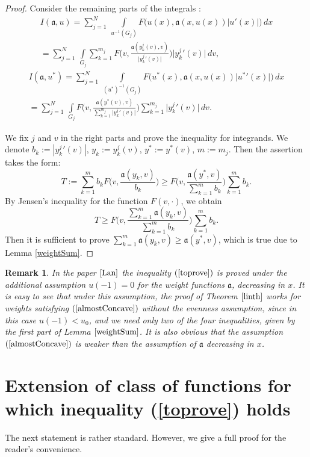 \documentclass[12pt]{article}
\newcommand{\abs}[1]{\left\vert#1\right\vert}
\newcommand{\bigabs}[1]{\bigl\vert#1\bigr\vert}
\renewcommand{\ge}{\geqslant}
\newtheorem{rem}{Remark}
\begin{document}
\begin{proof}
Consider the remaining parts of the integrals :
\begin{multline*}
I(\mathfrak a, u) = \sum_{j=1}^N \,\int\limits_{u^{-1}(G_j)} F\big(u(x), \mathfrak a(x, u(x)) \abs{u'(x)}\big) \, dx
\\ = \sum_{j=1}^N \,\int\limits_{G_j} \sum_{k=1}^{m_j} F\Big(v, \frac{\mathfrak a(y_k^j(v), v)}{\bigabs{y_k^j{}'(v)}}\Big) \bigabs{y_k^j{}'(v)} \, dv,
\end{multline*}
\begin{multline*}
I(\mathfrak a, u^*) = \sum_{j=1}^N \,\int\limits_{(u^*)^{-1}(G_j)} F\big(u^*(x), \mathfrak a(x, u(x)) \bigabs{u^*{}'(x)}\big) \, dx
\\ = \sum_{j=1}^N \,\int\limits_{G_j} F\Big(v, \frac{\mathfrak a(y^*(v), v)}{\sum_{k=1}^{m_j} \bigabs{y_k^j{}'(v)}}\Big)
\sum_{k=1}^{m_j} \bigabs{ y_k^j{}'(v) } \, dv.
\end{multline*}

We fix $j$ and $v$ in the right parts and prove the inequality for integrands.
We denote $b_k := |y_k^j{}'(v)|$, $y_k := y_k^j(v)$, $y^* := y^*(v)$, $m := m_j$.
Then the assertion takes the form:
$$T:=\sum_{k=1}^m b_k F\Big( v, \frac{ \mathfrak a(y_k, v) }{b_k} \Big)
\ge F\Big( v, \frac{ \mathfrak a(y^*, v) }{ \sum_{k=1}^m b_k  } \Big) \sum_{k=1}^m b_k.$$
By Jensen's inequality for the function $F(v, \cdot)$, we obtain
$$T \ge F\Big( v, \frac{ \sum_{k=1}^m \mathfrak a(y_k, v) }{ \sum_{k=1}^m b_k } \Big) \sum_{k=1}^m b_k.$$
Then it is sufficient to prove $\sum_{k=1}^m \mathfrak a(y_k, v) \ge \mathfrak a(y^*, v)$, which is true due to Lemma \ref{weightSum}.
\end{proof}

\begin{rem}
\label{landesLinear}
In the paper $\cite{Lan}$ the inequality $(\ref{toprove})$ is proved under the additional assumption $u(-1) = 0$
for the weight functions $\mathfrak a$, decreasing in $x$.
It is easy to see that under this assumption, the proof of Theorem $\ref{linth}$ works for weights satisfying
$(\ref{almostConcave})$ without the evenness assumption,
since in this case $u(-1) < u_0$, and we need only two of the four inequalities,
given by the first part of Lemma $\ref{weightSum}$.
It is also obvious that the assumption $(\ref{almostConcave})$ is weaker than the assumption of $\mathfrak a$ decreasing in $x$.
\end{rem}


\section{Extension of class of functions for which inequality (\ref{toprove}) holds}
The next statement is rather standard. However, we give a full proof for the reader's convenience.
\end{document}
